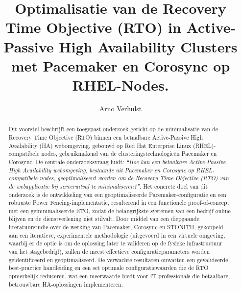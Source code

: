 \documentclass{hogent-article}
\title{Optimalisatie van de Recovery Time Objective (RTO) in Active-Passive High Availability Clusters met Pacemaker en Corosync op RHEL-Nodes.}
\author{Arno Verhulst}
\begin{document}
\begin{abstract}
    Dit voorstel beschrijft een toegepast onderzoek gericht op de minimalisatie van de Recovery Time Objective (RTO) binnen een betaalbare Active-Passive High Availability (HA) webomgeving, gebouwd op Red Hat Enterprise Linux (RHEL)-compatibele nodes, gebruikmakend van de clusteringstechnologieën Pacemaker en Corosync. De centrale onderzoeksvraag luidt: \textit{“Hoe kan een betaalbare Active-Passive High Availability webomgeving, bestaande uit Pacemaker en Corosync op RHEL-compatibele nodes, geoptimaliseerd worden om de Recovery Time Objective (RTO) van de webapplicatie bij serveruitval te minimaliseren?”}. Het concrete doel van dit onderzoek is de ontwikkeling van een geoptimaliseerde Pacemaker-configuratie en een robuuste Power Fencing-implementatie, resulterend in een functionele proof-of-concept met een geminimaliseerde RTO, zodat de belangrijkste systemen van een bedrijf online blijven en de dienstverlening niet stilvalt. Door middel van een diepgaande literatuurstudie over de werking van Pacemaker, Corosync en STONITH, gekoppeld aan een iteratieve, experimentele methodologie (uitgevoerd in een virtuele omgeving, waarbij er de optie is om de oplossing later te valideren op de fysieke infrastructuur van het stagebedrijf), zullen de meest effectieve configuratieparameters worden geïdentificeerd en geoptimaliseerd. De verwachte resultaten omvatten een gevalideerde best-practice handleiding en een set optimale configuratiewaarden die de RTO opmerkelijk reduceren, wat een meerwaarde biedt voor IT-professionals die betaalbare, betrouwbare HA-oplossingen implementeren.
\end{abstract}

\tableofcontents



\printbibliography[heading=bibintoc]
\end{document}
